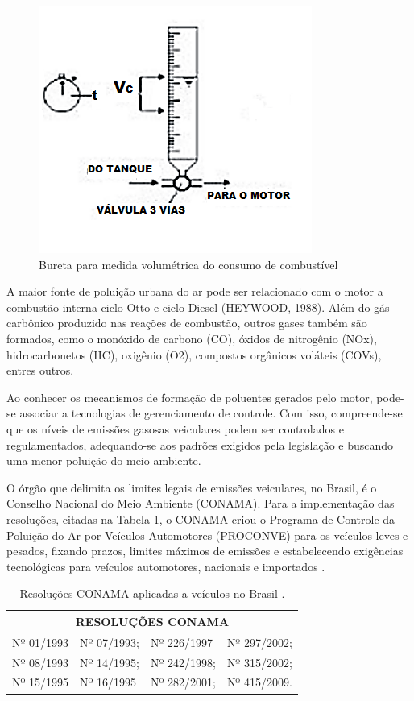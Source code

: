 \begin{figure}[h!]
	\centering
	\includegraphics[keepaspectratio=true,scale= 0.7]{figuras/bureta-graduada.PNG}
	\caption{Bureta para medida volumétrica do consumo de combustível}
	\label{buretaGraduada}
\end{figure}

A maior fonte de poluição urbana do ar pode ser relacionado com o motor a combustão interna ciclo Otto e ciclo Diesel (HEYWOOD, 1988). Além do gás carbônico produzido nas reações de combustão, outros gases também são formados, como  o monóxido de carbono (CO), óxidos de nitrogênio (NOx), hidrocarbonetos (HC), oxigênio (O2), compostos orgânicos voláteis (COVs), entres outros.

Ao conhecer os mecanismos de formação de poluentes gerados pelo motor, pode-se associar a tecnologias de gerenciamento de controle. Com isso, compreende-se que os níveis de emissões gasosas veiculares podem ser controlados e regulamentados, adequando-se aos padrões exigidos pela legislação e buscando uma menor poluição do meio ambiente. 

O órgão que delimita os limites legais de emissões veiculares, no Brasil, é o Conselho Nacional do Meio Ambiente (CONAMA). Para a implementação das resoluções, citadas na Tabela 1, o CONAMA criou o Programa de Controle da Poluição do Ar por Veículos Automotores (PROCONVE) para os veículos leves e pesados, fixando prazos, limites máximos de emissões e estabelecendo exigências tecnológicas para veículos automotores, nacionais e importados \cite{energiaAvaliacao}.

\begin{table}[h!]
	\centering
	\caption{Resoluções CONAMA aplicadas a veículos no Brasil \cite{energiaAvaliacao}.}
	\label{resoluçõesConama}
	\begin{tabular}{|l|l|l|l|}
		\hline
		\multicolumn{4}{|c|}{RESOLUÇÕES CONAMA} \\ \hline
		Nº 01/1993      & Nº 07/1993;      & Nº 226/1997     & Nº 297/2002;     \\ \hline
		Nº 08/1993      & Nº 14/1995;      & Nº 242/1998;     & Nº 315/2002;     \\ \hline
		Nº 15/1995      & Nº 16/1995      & Nº 282/2001;     & Nº 415/2009.     \\ \hline
	\end{tabular}
\end{table}

